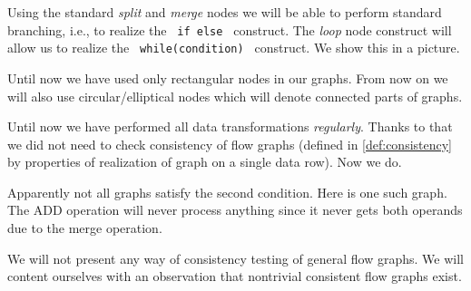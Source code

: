Using the standard \emph{split} and \emph{merge} nodes we will be able to perform standard branching, i.e., to realize the \texttt{ if \string{\string} else \string{\string} } construct. The \emph{loop} node construct will allow us to realize the \texttt{ while(condition) \string{\string} } construct. We show this in a picture.

\begin{rem}
  Until now we have used only rectangular nodes in our graphs. From now on we will also use circular/elliptical nodes which will denote connected parts of graphs.
\end{rem}

\label{sec:cf_constructs}

Until now we have performed all data transformations \emph{regularly}. Thanks to that we did not need to check consistency of flow graphs (defined in \ref{def:consistency} by properties of realization of graph on a single data row). Now we do.

Apparently not all graphs satisfy the second condition. Here is one such graph. The ADD operation will never process anything since it never gets both operands due to the merge operation.


We will not present any way of consistency testing of general flow graphs. We will content ourselves with an observation that nontrivial consistent flow graphs exist.

